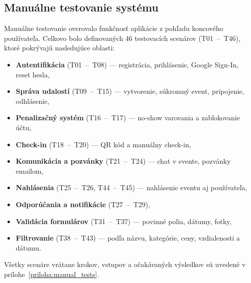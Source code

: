 \subsection{Manuálne testovanie systému}

Manuálne testovanie overovalo funkčnosť aplikácie z pohľadu koncového používateľa.
Celkovo bolo definovaných 46 testovacích scenárov (T01~--~T46), ktoré pokrývajú
nasledujúce oblasti:

\begin{itemize}[noitemsep]
    \item \textbf{Autentifikácia} (T01~--~T08) — registrácia, prihlásenie, Google Sign-In, reset hesla,
    \item \textbf{Správa udalostí} (T09~--~T15) — vytvorenie, súkromný event, pripojenie, odhlásenie,
    \item \textbf{Penalizačný systém} (T16~--~T17) — no-show varovania a zablokovanie účtu,
    \item \textbf{Check-in} (T18~--~T20) — QR kód a manuálny check-in,
    \item \textbf{Komunikácia a pozvánky} (T21~--~T24) — chat v evente, pozvánky emailom,
    \item \textbf{Nahlásenia} (T25~--~T26, T44~--~T45) — nahlásenie eventu aj používateľa,
    \item \textbf{Odporúčania a notifikácie} (T27~--~T29),
    \item \textbf{Validácia formulárov} (T31~--~T37) — povinné polia, dátumy, fotky,
    \item \textbf{Filtrovanie} (T38~--~T43) — podľa názvu, kategórie, ceny, vzdialenosti a dátumu.
\end{itemize}

Všetky scenáre vrátane krokov, vstupov a očakávaných výsledkov sú uvedené
v prílohe~\ref{priloha:manual_tests}.
